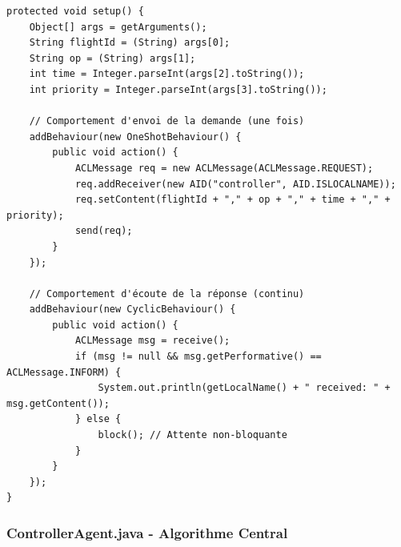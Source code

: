 \documentclass[12pt,a4paper]{article}
\begin{document}
\begin{lstlisting}[caption=FlightAgent.java - Comportement de demande]
protected void setup() {
    Object[] args = getArguments();
    String flightId = (String) args[0];
    String op = (String) args[1];
    int time = Integer.parseInt(args[2].toString());
    int priority = Integer.parseInt(args[3].toString());

    // Comportement d'envoi de la demande (une fois)
    addBehaviour(new OneShotBehaviour() {
        public void action() {
            ACLMessage req = new ACLMessage(ACLMessage.REQUEST);
            req.addReceiver(new AID("controller", AID.ISLOCALNAME));
            req.setContent(flightId + "," + op + "," + time + "," + priority);
            send(req);
        }
    });

    // Comportement d'écoute de la réponse (continu)
    addBehaviour(new CyclicBehaviour() {
        public void action() {
            ACLMessage msg = receive();
            if (msg != null && msg.getPerformative() == ACLMessage.INFORM) {
                System.out.println(getLocalName() + " received: " + msg.getContent());
            } else {
                block(); // Attente non-bloquante
            }
        }
    });
}
\end{lstlisting}

\subsubsection{ControllerAgent.java - Algorithme Central}
\end{document}
